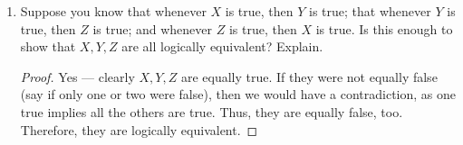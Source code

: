 \documentclass[../main.tex]{subfiles}
\begin{document}
\begin{enumerate}[ref={\thesection.\arabic*}]
\begin{proof}
    \end{proof}
    \item \label{exr:A.1.6}Suppose you know that whenever $X$ is true, then $Y$ is true; that whenever $Y$ is true, then $Z$ is true; and whenever $Z$ is true, then $X$ is true. Is this enough to show that $X,Y,Z$ are all logically equivalent? Explain.
    \begin{proof}
        Yes --- clearly $X,Y,Z$ are equally true. If they were not equally false (say if only one or two were false), then we would have a contradiction, as one true implies all the others are true. Thus, they are equally false, too. Therefore, they are logically equivalent.
    \end{proof}
\end{enumerate}
\end{document}

